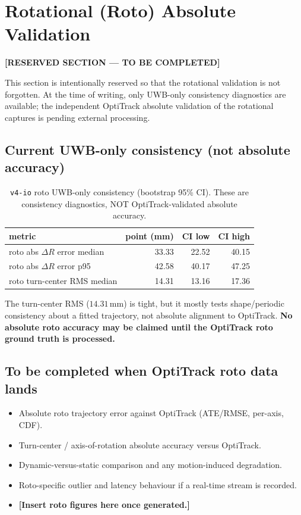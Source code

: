 \documentclass[11pt,a4paper]{article}
\newcommand{\mm}{\,\si{\milli\meter}}
\newcommand{\todo}[1]{{\color{red}\textbf{[#1]}}}
\begin{document}
\section{Rotational (Roto) Absolute Validation}
\label{sec:roto}

\todo{RESERVED SECTION --- TO BE COMPLETED}

\noindent
This section is intentionally reserved so that the rotational validation is not forgotten.
At the time of writing, only UWB-only consistency diagnostics are available; the independent
OptiTrack absolute validation of the rotational captures is pending external processing.

\subsection{Current UWB-only consistency (not absolute accuracy)}
\begin{table}[h]
\centering
\caption{\texttt{v4-io} roto UWB-only consistency (bootstrap 95\% CI). These are consistency
diagnostics, NOT OptiTrack-validated absolute accuracy.}
\begin{tabular}{lrrr}
\toprule
metric & point (\si{\milli\meter}) & CI low & CI high \\
\midrule
roto abs $\Delta R$ error median   & 33.33 & 22.52 & 40.15 \\
roto abs $\Delta R$ error p95      & 42.58 & 40.17 & 47.25 \\
roto turn-center RMS median        & 14.31 & 13.16 & 17.36 \\
\bottomrule
\end{tabular}
\end{table}

\noindent
The turn-center RMS ($14.31\mm$) is tight, but it mostly tests shape/periodic consistency
about a fitted trajectory, not absolute alignment to OptiTrack. \textbf{No absolute roto
accuracy may be claimed until the OptiTrack roto ground truth is processed.}

\subsection{To be completed when OptiTrack roto data lands}
\begin{itemize}[leftmargin=1.4em]
  \item Absolute roto trajectory error against OptiTrack (ATE/RMSE, per-axis, CDF).
  \item Turn-center / axis-of-rotation absolute accuracy versus OptiTrack.
  \item Dynamic-versus-static comparison and any motion-induced degradation.
  \item Roto-specific outlier and latency behaviour if a real-time stream is recorded.
  \item \todo{Insert roto figures here once generated.}
\end{itemize}
\end{document}
